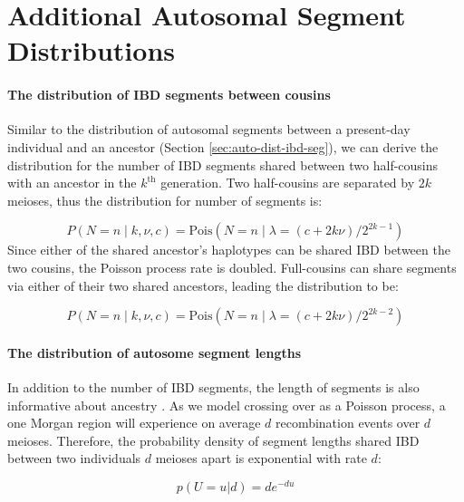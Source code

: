 \documentclass[9pt,twocolumn,twoside]{gsajnl}
\begin{document}
\section*{Additional Autosomal Segment Distributions}
\label{ap:auto-cousin}
\paragraph{The distribution of IBD segments between cousins}

Similar to the distribution of autosomal segments between a present-day
individual and an ancestor (Section \ref{sec:auto-dist-ibd-seg}), we can derive
the distribution for the number of IBD segments shared between two half-cousins
with an ancestor in the $k^\text{th}$ generation. Two half-cousins are
separated by $2k$ meioses, thus the distribution for number of segments is:

\begin{equation}
  \label{eq:auto-seg-cousins}
  P(N=n \;|\; k, \nu, c) = \text{Pois}\left(N = n \;|\; \lambda=(c + 2 k \nu)/2^{2 k - 1} \right)
\end{equation}
%
Since either of the shared ancestor's haplotypes can be shared IBD between the
two cousins, the Poisson process rate is doubled. Full-cousins can share segments
via either of their two shared ancestors, leading the distribution to be:

\begin{equation*}
  P(N=n \;|\; k, \nu, c) = \text{Pois}\left(N = n \;|\; \lambda=(c + 2 k \nu)/2^{2 k - 2} \right)
\end{equation*}


\paragraph{The distribution of autosome segment lengths}

In addition to the number of IBD segments, the length of segments is also
informative about ancestry \citep[e.g.][]{palamara2012length}. As we model
crossing over as a Poisson process, a one Morgan region will experience on
average $d$ recombination events over $d$ meioses. Therefore, the probability
density of segment lengths shared IBD between two individuals $d$ meioses apart
is exponential with rate $d$:

\begin{equation}
  \label{eq:auto-seg-lens}
  p(U=u | d) = d e^{-du}
\end{equation}
\end{document}
